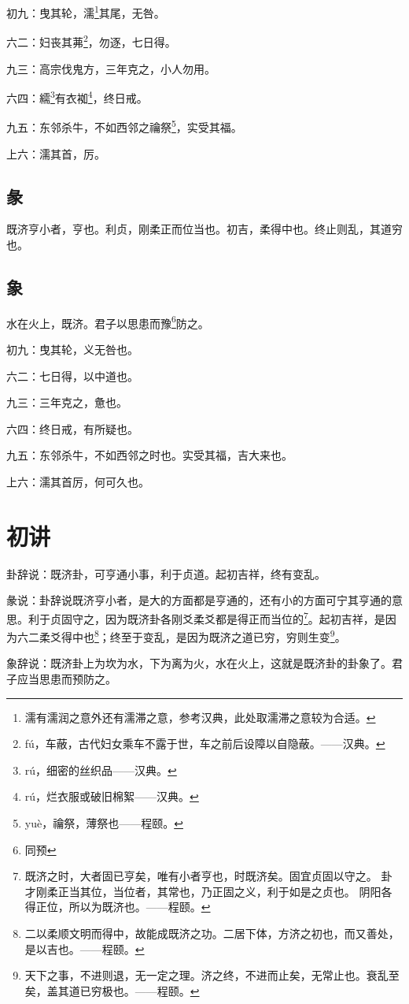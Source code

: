 \documentclass[12pt,oneside]{book}
\begin{document}
初九：曳其轮，濡\footnote{濡有濡润之意外还有濡滞之意，参考汉典，此处取濡滞之意较为合适。}其尾，无咎。

六二：妇丧其茀\footnote{fú，车蔽，古代妇女乘车不露于世，车之前后设障以自隐蔽。——汉典。}，勿逐，七日得。

九三：高宗伐鬼方，三年克之，小人勿用。

六四：繻\footnote{rú，细密的丝织品——汉典。}有衣袽\footnote{rú，烂衣服或破旧棉絮——汉典。}，终日戒。

九五：东邻杀牛，不如西邻之禴祭\footnote{yuè，禴祭，薄祭也——程颐。}，实受其福。

上六：濡其首，厉。

\subsection{彖}
既济亨小者，亨也。利贞，刚柔正而位当也。初吉，柔得中也。终止则乱，其道穷也。

\subsection{象}
水在火上，既济。君子以思患而豫\footnote{同预}防之。

初九：曳其轮，义无咎也。

六二：七日得，以中道也。

九三：三年克之，惫也。

六四：终日戒，有所疑也。

九五：东邻杀牛，不如西邻之时也。实受其福，吉大来也。

上六：濡其首厉，何可久也。

\section{初讲}
卦辞说：既济卦，可亨通小事，利于贞道。起初吉祥，终有变乱。

彖说：卦辞说既济亨小者，是大的方面都是亨通的，还有小的方面可宁其亨通的意思。利于贞固守之，因为既济卦各刚爻柔爻都是得正而当位的\footnote{既济之时，大者固已亨矣，唯有小者亨也，时既济矣。固宜贞固以守之。 卦才刚柔正当其位，当位者，其常也，乃正固之义，利于如是之贞也。 阴阳各得正位，所以为既济也。——程颐。}。起初吉祥，是因为六二柔爻得中也\footnote{二以柔顺文明而得中，故能成既济之功。二居下体，方济之初也，而又善处，是以吉也。——程颐。}；终至于变乱，是因为既济之道已穷，穷则生变\footnote{天下之事，不进则退，无一定之理。济之终，不进而止矣，无常止也。衰乱至矣，盖其道已穷极也。——程颐。}。

象辞说：既济卦上为坎为水，下为离为火，水在火上，这就是既济卦的卦象了。君子应当思患而预防之。
\end{document}
